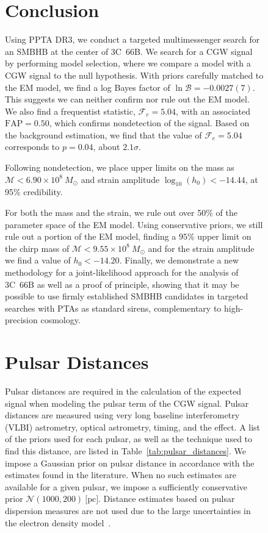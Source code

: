  \begin{figure}[h]

\section{\label{sec:conclusion} Conclusion}

Using PPTA DR3, we conduct a targeted multimessenger search for an SMBHB at the center of 3C~66B. 
We search for a CGW signal by performing model selection, where we compare a model with a CGW signal to the null hypothesis. 
With priors carefully matched to the EM model, we find a log Bayes factor of $\ln \mathcal{B} = -0.0027(7)$. 
This suggests we can neither confirm nor rule out the EM model. 
We also find a frequentist statistic, $\mathcal{F}_e = 5.04$, with an associated $\text{FAP}=0.50$, which confirms nondetection of the signal. 
Based on the background estimation, we find that the value of $\mathcal{F}_e = 5.04$ corresponds to $p=0.04$, about $2.1\sigma$. 

Following nondetection, we place upper limits on the mass as $\mathcal{M} < 6.90 \times 10^8~M_{\odot}$  and strain amplitude $\log_{10}(h_0) < -14.44$, at 95\% credibility. 

For both the mass and the strain, we rule out over 50\% of the parameter space of the EM model. 
Using conservative priors, we still rule out a portion of the EM model, finding a $95\%$ upper limit on the chirp mass of $\mathcal{M} < 9.55 \times 10^8~M_{\odot}$ and for the strain amplitude we find a value of $h_0 < -14.20 $. 
Finally, we demonstrate a new methodology for a joint-likelihood approach for the analysis of 3C~66B as well as a proof of principle, showing that it may be possible to use firmly established SMBHB candidates in targeted searches with PTAs as standard sirens, complementary to high-precision cosmology.

\section{\label{sec:appendix:pdist}Pulsar Distances}

Pulsar distances are required in the calculation of the expected signal when modeling the pulsar term of the CGW signal. 
Pulsar distances are measured using very long baseline interferometry (VLBI) astrometry, optical astrometry, timing, and the \citet{Shklovskii1970} effect. 
A list of the priors used for each pulsar, as well as the technique used to find this distance, are listed in Table~\ref{tab:pulsar_distances}. 
We impose a Gaussian prior on pulsar distance in accordance with the estimates found in the literature. 
When no such estimates are available for a given pulsar, we impose a sufficiently conservative prior $\mathcal{N}(1000,200)~\text{[pc]}$. 
Distance estimates based on pulsar dispersion measures are not used due to the large uncertainties in the electron density model~\citep{YaoManchester2017}. 


\end{figure}

